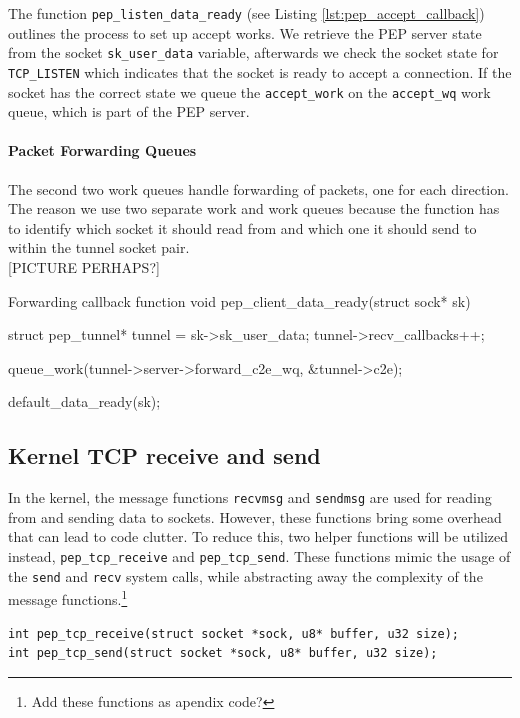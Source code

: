 \documentclass[a4paper,english, 11pt]{report}
\begin{document}
The function \verb|pep_listen_data_ready| (see Listing \ref{lst:pep_accept_callback}) outlines the process to set up accept works. We retrieve the PEP server state from the socket \verb|sk_user_data| variable, afterwards we check the socket state for \verb|TCP_LISTEN| which indicates that the socket is ready to accept a connection. If the socket has the correct state we queue the \verb|accept_work| on the \verb|accept_wq| work queue, which is part of the PEP server.

\paragraph{Packet Forwarding Queues}\label{sec:forward_queues}
The second two work queues handle forwarding of packets, one for each direction. The reason we use two separate work and work queues because the function has to identify which socket it should read from and which one it should send to within the tunnel socket pair. \\

[PICTURE PERHAPS?]

\begin{autonumlstlisting}[label=lst:pep_forward_callback]{Forwarding callback function}
void pep_client_data_ready(struct sock* sk)
{
	struct pep_tunnel* tunnel = sk->sk_user_data;
	tunnel->recv_callbacks++;
        
	queue_work(tunnel->server->forward_c2e_wq, &tunnel->c2e);
        
	default_data_ready(sk);
}
\end{autonumlstlisting}

\subsection{Kernel TCP receive and send}
In the kernel, the message functions \verb|recvmsg| and \verb|sendmsg| are used for reading from and sending data to sockets. However, these functions bring some overhead that can lead to code clutter. To reduce this, two helper functions will be utilized instead, \verb|pep_tcp_receive| and \verb|pep_tcp_send|. These functions mimic the usage of the \verb|send| and \verb|recv| system calls, while abstracting away the complexity of the message functions.\footnote{Add these functions as apendix code?}

\begin{verbatim}
int pep_tcp_receive(struct socket *sock, u8* buffer, u32 size);
int pep_tcp_send(struct socket *sock, u8* buffer, u32 size);
\end{verbatim}
\end{document}
